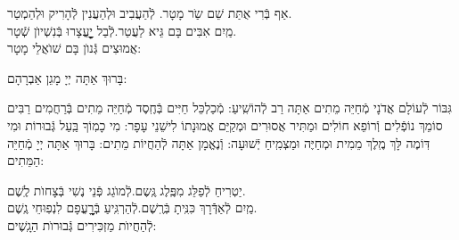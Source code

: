 \documentclass[twoside, openany, parskip=half, 11pt]{book}
\begin{document}


אַף בְּֿרִי אֻתַּת שֵׁם שַֹר מָטָר. \hfill לְֿהַעֲבִיב וּלְהַעֲנִין לְֿהָרִיק וּלְהַמְטַר.\\
מַֽיִם אִבִּים בָּם גֵּיא לַעֲטַר.\hfill לְֿבַל יׇׇׇׇׇׇׇׇׇׇׇׇָעֳצָרוּ בְּֿנִשְׁיוׂן שְֿׁטָר.\\
אֲמוּצִים גְּֿנוׂן בָּם שׁוׂאֲלֵי מָטָר:



בָּרוּךְ אַתָּה יְיָ מָגֵן אַבְרָהָם:

גִּבּוֹר לְֿעוֹלָם אֲדֹנָי מְֿחַיֵּה מֵתִים אַתָּה רַב לְֿהוֹשִֽׁיעַ: מְֿכַלְכֵּל חַיִּים בְּֿחֶֽסֶד מְֿחַיֵּה מֵתִים בְּֿרַחֲמִים רַבִּים סוֹמֵךְ נוֹפְֿלִים וְֿרוֹפֵא חוֹלִים וּמַתִּיר אֲסוּרִים וּמְקַיֵּם אֱמוּנָתוֹ לִישֵׁנֵי עָפָר: מִי כָמֽוֹךָ בַּֽעַל גְּֿבוּרוֹת וּמִי דּֽוֹמֶה לָּךְ מֶֽלֶךְ מֵמִית וּמְחַיֶּה וּמַצְמִֽיחַ יְֿשׁוּעָה: וְֿנֶאֱמָן אַתָּה לְֿהַחֲיוֹת מֵתִים: בָּרוּךְ אַתָּה יְיָ מְֿחַיֵּה הַמֵּתִים:





יַטְרִיחַ לְֿפַלֵּג מִפֶּֽלֶג גֶּֽשֶם.\hfill לְֿמוׂגֵג פְּֿנֵי נֶשִׁי בְּֿצָחוׂת לֶֽשֶׁם.\\
מַֽיִם לְֿאַדְּֿֿרָךְ כִּנִּֽיתָ בְּֿרֶֽשֶׁם.\hfill לְֿהַרְגִּֽיעַ בְּֿרׇׇׇׇׇׇׇׇָעֳפָם לִנְפֽוּחֵי גֶֽשֶׁם.\\
לְֿהַחֲיוׂת מַזְכִּירִים גְּֿבוּרוׂת הַגָֽשֶׁים:
\end{document}
